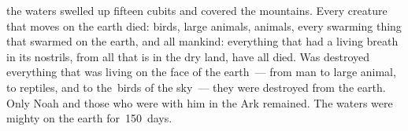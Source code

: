 \begin{inparaenum}
   the waters swelled up fifteen cubits and covered the mountains.%
   Every creature that moves on the earth died: birds, large animals, animals, every swarming thing that swarmed on the earth, and all mankind:%
   everything that had a living breath in its nostrils, from all that is in the dry land, have all died.%
   Was destroyed everything that was living on the face of the earth~--- from man to large animal, to reptiles, and to the\understood{}\ birds of the sky~--- they were destroyed from the earth. Only Noah and those who were with him in the Ark remained.%
   The waters were mighty on the earth for\understood{}\ 150~days.%
\end{inparaenum}
